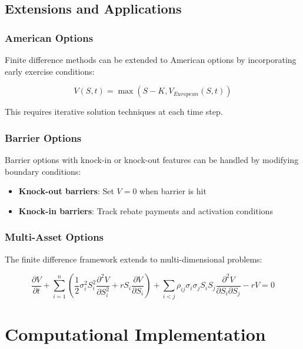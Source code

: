 \documentclass[12pt,a4paper]{article}
\numberwithin{algorithm}{subsection}
\begin{document}
\subsection{Extensions and Applications}

\subsubsection{American Options}

Finite difference methods can be extended to American options by incorporating early exercise conditions:

\begin{equation}
V(S,t) = \max(S - K, V_{European}(S,t))
\end{equation}

This requires iterative solution techniques at each time step.

\subsubsection{Barrier Options}

Barrier options with knock-in or knock-out features can be handled by modifying boundary conditions:

\begin{itemize}
\item \textbf{Knock-out barriers}: Set $V = 0$ when barrier is hit
\item \textbf{Knock-in barriers}: Track rebate payments and activation conditions
\end{itemize}

\subsubsection{Multi-Asset Options}

The finite difference framework extends to multi-dimensional problems:

\begin{equation}
\frac{\partial V}{\partial t} + \sum_{i=1}^n \left( \frac{1}{2}\sigma_i^2 S_i^2 \frac{\partial^2 V}{\partial S_i^2} + r S_i \frac{\partial V}{\partial S_i} \right) + \sum_{i<j} \rho_{ij}\sigma_i\sigma_j S_i S_j \frac{\partial^2 V}{\partial S_i \partial S_j} - rV = 0
\end{equation}

\section{Computational Implementation}
\end{document}
